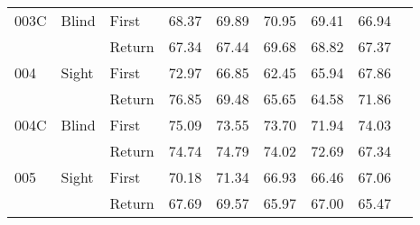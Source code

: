 \begin{table}[!htb]
\begin{tabular}{lllrrrrrr}
003C & Blind & First &  68.37 &  69.89 &                                                 70.95 &                                                  69.41 &   66.94 \\
    &       & Return &  67.34 &  67.44 &                                                 69.68 &                                                  68.82 &   67.37 \\
004 & Sight & First &  72.97 &  66.85 &                                                 62.45 &                                                  65.94 &   67.86 \\
    &       & Return &  76.85 &  69.48 &                                                 65.65 &                                                  64.58 &   71.86 \\
004C & Blind & First &  75.09 &  73.55 &                                                 73.70 &                                                  71.94 &   74.03 \\
    &       & Return &  74.74 &  74.79 &                                                 74.02 &                                                  72.69 &   67.34 \\
005 & Sight & First &  70.18 &  71.34 &                                                 66.93 &                                                  66.46 &   67.06 \\
    &       & Return &  67.69 &  69.57 &                                                 65.97 &                                                  67.00 &   65.47 \\
\bottomrule
\end{tabular}
\end{table}

